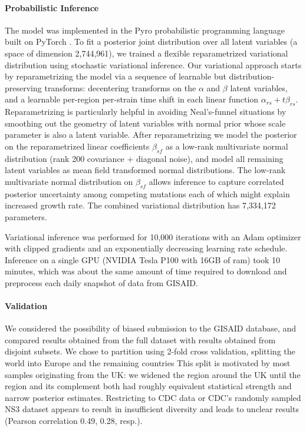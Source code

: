 \documentclass[12pt]{article}
\begin{document}
\paragraph*{Probabilistic Inference}

The model was implemented in the Pyro probabilistic programming language \cite{bingham2019pyro} built on PyTorch \cite{paszke2017automatic}.
To fit a posterior joint distribution over all latent variables (a space of dimension 2,744,961), we trained a flexible reparametrized variational distribution using stochastic variational inference.
Our variational approach starts by reparametrizing the model via a sequence of learnable but distribution-preserving transforms: decentering transforms \cite{gorinova2020automatic} on the $\alpha$ and $\beta$ latent variables, and a learnable per-region per-strain time shift in each linear function $\alpha_{rs}+t\beta_{rs}$.
Reparametrizing is particularly helpful in avoiding Neal's-funnel situations \cite{neal2003slice} by smoothing out the geometry of latent variables with normal prior whose scale parameter is also a latent variable.
After reparametrizing we model the posterior on the reparametrized linear coefficients $\beta_{sf}$ as a low-rank multivariate normal distribution (rank 200 covariance + diagonal noise), and model all remaining latent variables as mean field transformed normal distributions.
The low-rank multivariate normal distribution on $\beta_{sf}$ allows inference to capture correlated posterior uncertainty among competing mutations each of which might explain increased growth rate.
The combined variational distribution has 7,334,172 parameters.

Variational inference was performed for 10,000 iterations with an Adam optimizer with clipped gradients and an exponentially decreasing learning rate schedule.
Inference on a single GPU (NVIDIA Tesla P100 with 16GB of ram) took 10 minutes, which was about the same amount of time required to download and preprocess each daily snapshot of data from GISAID.

\paragraph*{Validation}

We considered the possibility of biased submission to the GISAID database, and compared results obtained from the full dataset with results obtained from disjoint subsets.
We chose to partition using 2-fold cross validation, splitting the world into Europe and the remaining countries
This split is motivated by most samples originating from the UK: we widened the region around the UK until the region and its complement both had roughly equivalent statistical strength and narrow posterior estimates.
Restricting to CDC data or CDC's randomly sampled NS3 dataset appears to result in insufficient diversity and leads to unclear results (Pearson correlation 0.49, 0.28, resp.).




\end{document}
